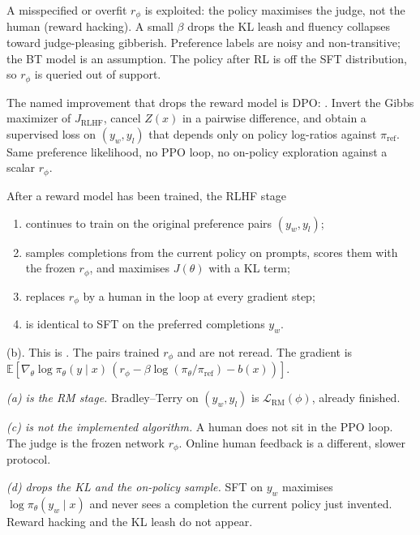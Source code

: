 \begin{remark}
\label{rem:nlpu-align-limits}
A misspecified or overfit $r_\phi$ is exploited: the policy maximises the judge, not the human (reward hacking). A small $\beta$ drops the KL leash and fluency collapses toward judge-pleasing gibberish. Preference labels are noisy and non-transitive; the BT model is an assumption. The policy after RL is off the SFT distribution, so $r_\phi$ is queried out of support.

The named improvement that drops the reward model is DPO: . Invert the Gibbs maximizer of $J_{\mathrm{RLHF}}$, cancel $Z(x)$ in a pairwise difference, and obtain a supervised loss on $(y_w,y_l)$ that depends only on policy log-ratios against $\pi_{\mathrm{ref}}$. Same preference likelihood, no PPO loop, no on-policy exploration against a scalar $r_\phi$.
\end{remark}

\begin{exercise}
\label{ex:nlpu-rlhf-stage}
After a reward model has been trained, the RLHF stage
\begin{enumerate}[label=(\alph*)]
    \item continues to train on the original preference pairs $(y_w,y_l)$;
    \item samples completions from the current policy on prompts, scores them with the frozen $r_\phi$, and maximises $J(\theta)$ with a KL term;
    \item replaces $r_\phi$ by a human in the loop at every gradient step;
    \item is identical to SFT on the preferred completions $y_w$.
\end{enumerate}
\end{exercise}

\begin{solution}
(b). This is . The pairs trained $r_\phi$ and are not reread. The gradient is $\mathbb{E}[\nabla_\theta\log\pi_\theta(y\mid x)\,(r_\phi-\beta\log(\pi_\theta/\pi_{\mathrm{ref}})-b(x))]$.

\textit{(a) is the RM stage.}
Bradley--Terry on $(y_w,y_l)$ is $\mathcal{L}_{\mathrm{RM}}(\phi)$, already finished.

\textit{(c) is not the implemented algorithm.}
A human does not sit in the PPO loop. The judge is the frozen network $r_\phi$. Online human feedback is a different, slower protocol.

\textit{(d) drops the KL and the on-policy sample.}
SFT on $y_w$ maximises $\log\pi_\theta(y_w\mid x)$ and never sees a completion the current policy just invented. Reward hacking and the KL leash do not appear.
\end{solution}

